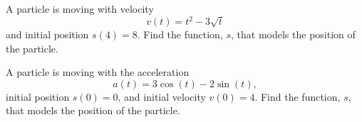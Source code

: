 \documentclass[10pt]{amsart}
\begin{document}
\newpage

\begin{thm}
  A particle is moving with velocity
  \[v(t) = t^2 - 3\sqrt{t}\]
  and initial position \(s(4) = 8\).
  Find the function, \(s\), that models the position of the particle.
\end{thm}

\vspace{3in}

\begin{thm}
  A particle is moving with the acceleration
  \[a(t) = 3\cos(t) - 2\sin(t),\]
  initial position \(s(0) = 0\), and initial velocity \(v(0) = 4\).
  Find the function, \(s\), that models the position of the particle.
\end{thm}
\end{document}
